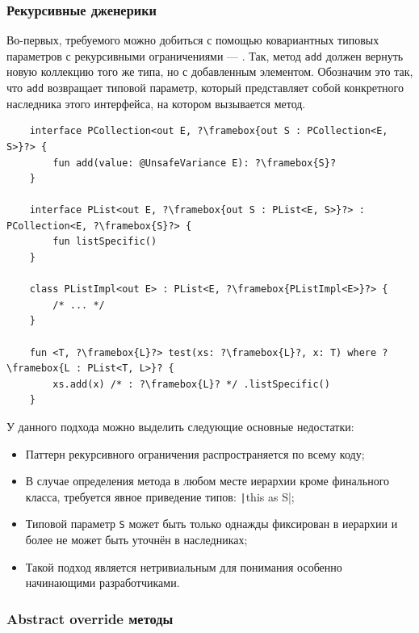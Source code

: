 \subsubsection{Рекурсивные дженерики} \label{subsubsec:recursive-generics}

Во-первых, требуемого можно добиться с помощью ковариантных типовых параметров с рекурсивными ограничениями --- .
Так, метод \texttt{add} должен вернуть новую коллекцию того же типа, но с добавленным элементом.
Обозначим это так, что \texttt{add} возвращает типовой параметр, который представляет собой конкретного наследника этого интерфейса, на котором вызывается метод.

\begin{verbatim}
    interface PCollection<out E, ?\framebox{out S : PCollection<E, S>}?> {
        fun add(value: @UnsafeVariance E): ?\framebox{S}?
    }

    interface PList<out E, ?\framebox{out S : PList<E, S>}?> : PCollection<E, ?\framebox{S}?> {
        fun listSpecific()
    }

    class PListImpl<out E> : PList<E, ?\framebox{PListImpl<E>}?> {
        /* ... */
    }

    fun <T, ?\framebox{L}?> test(xs: ?\framebox{L}?, x: T) where ?\framebox{L : PList<T, L>}? {
        xs.add(x) /* : ?\framebox{L}? */ .listSpecific()
    }
\end{verbatim}

У данного подхода можно выделить следующие основные недостатки:
\begin{itemize}
    \item Паттерн рекурсивного ограничения распространяется по всему коду;
    \item В случае определения метода в любом месте иерархии кроме финального класса, требуется явное приведение типов: \texttt|this as S|;
    \item Типовой параметр \texttt{S} может быть только однажды фиксирован в иерархии и более не может быть уточнён в наследниках;
    \item Такой подход является нетривиальным для понимания особенно начинающими разработчиками.
\end{itemize}

\subsubsection{Abstract override методы} \label{subsubsec:abstract-override}

